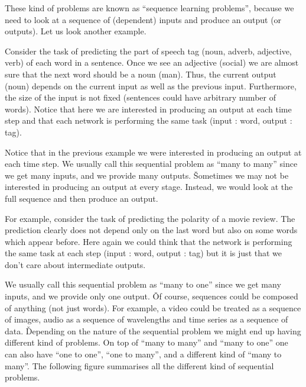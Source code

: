 \ee

These kind of problems are known as ``sequence learning problems'', because we need to look at a sequence of
(dependent) inputs and produce an output (or outputs). Let us look another example.

\be
Consider the task of predicting the part of speech tag (noun, adverb, adjective, verb) of each word in a sentence.
Once we see an adjective (social) we are almost sure that the next word should be a noun (man). Thus, the current
output (noun) depends on the current input as well as the previous input. Furthermore, the size of the input is not
fixed (sentences could have arbitrary number of words). Notice that here we are interested in producing an output at
each time step and that each network is performing the same task (input : word, output : tag).

\ee

Notice that in the previous example we were interested in producing an output at each time step. We usually call this
sequential problem as ``many to many'' since we get many inputs, and we provide many outputs. \v

Sometimes we may not be interested in producing an output at every stage. Instead, we would look at the full sequence
and then produce an output.

\be
For example, consider the task of predicting the polarity of a movie review. The prediction clearly does not depend
only on the last word but also on some words which appear before. Here again we could think that the network is
performing the same task at each step (input : word, output : tag) but it is just that we don't care about
intermediate outputs.

\vspace{-10pt}


\vspace{-10pt}
\ee

We usually call this sequential problem as ``many to one'' since we get many inputs, and we provide only one output. \v

Of course, sequences could be composed of anything (not just words). For example, a video could be treated as a
sequence of images, audio as a sequence of wavelengths and time series as a sequence of data. \v

Depending on the nature of the sequential problem we might end up having different kind of problems. On top of ``many
to many'' and ``many to one'' one can also have ``one to one'', ``one to many'', and a different kind of ``many to
many''. The following figure summarises all the different kind of sequential problems.

